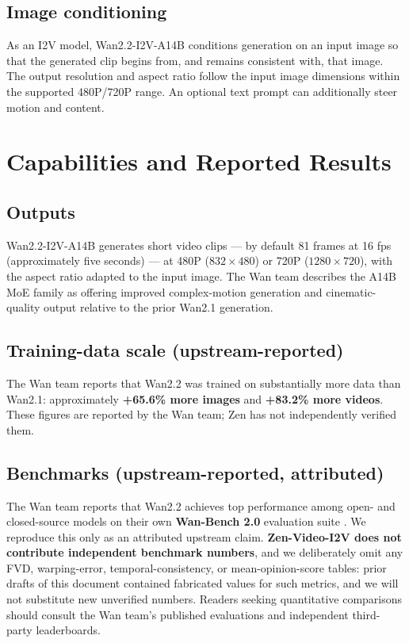 \documentclass[11pt,a4paper]{article}
\begin{document}
\subsection{Image conditioning}

As an I2V model, Wan2.2-I2V-A14B conditions generation on an input image so that the generated clip begins from, and remains consistent with, that image. The output resolution and aspect ratio follow the input image dimensions within the supported 480P/720P range. An optional text prompt can additionally steer motion and content.

\section{Capabilities and Reported Results}

\subsection{Outputs}

Wan2.2-I2V-A14B generates short video clips --- by default 81 frames at 16 fps (approximately five seconds) --- at 480P ($832\times 480$) or 720P ($1280\times 720$), with the aspect ratio adapted to the input image. The Wan team describes the A14B MoE family as offering improved complex-motion generation and cinematic-quality output relative to the prior Wan2.1 generation.

\subsection{Training-data scale (upstream-reported)}

The Wan team reports that Wan2.2 was trained on substantially more data than Wan2.1: approximately \textbf{+65.6\% more images} and \textbf{+83.2\% more videos}. These figures are reported by the Wan team; Zen has not independently verified them.

\subsection{Benchmarks (upstream-reported, attributed)}

The Wan team reports that Wan2.2 achieves top performance among open- and closed-source models on their own \textbf{Wan-Bench 2.0} evaluation suite \cite{wan22repo}. We reproduce this only as an attributed upstream claim. \textbf{Zen-Video-I2V does not contribute independent benchmark numbers}, and we deliberately omit any FVD, warping-error, temporal-consistency, or mean-opinion-score tables: prior drafts of this document contained fabricated values for such metrics, and we will not substitute new unverified numbers. Readers seeking quantitative comparisons should consult the Wan team's published evaluations and independent third-party leaderboards.
\end{document}
